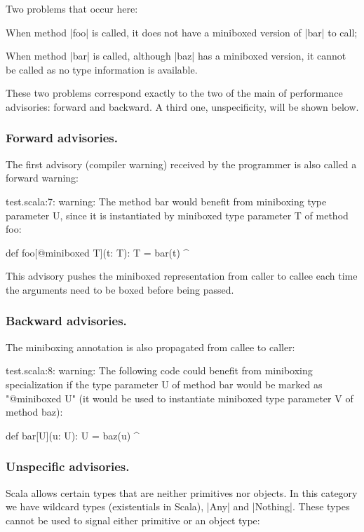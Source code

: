 Two problems that occur here:

\begin{compactitem}
 \item When method |foo| is called, it does not have a miniboxed version of |bar| to call;
 \item When method |bar| is called, although |baz| has a miniboxed version, it cannot be called as no type information is available.
\end{compactitem}

These two problems correspond exactly to the two of the main of performance advisories: forward and backward. A third one, unspecificity, will be shown below.

\subsubsection{Forward advisories.} The first advisory (compiler warning) received by the programmer is also called a forward warning:

\begin{lstlisting-nobreak-nolang}
test.scala:7: warning: The method bar would benefit from miniboxing type parameter U, since it is instantiated by miniboxed type parameter T of method foo:

       def foo[@miniboxed T](t: T): T = bar(t)
                                        ^
\end{lstlisting-nobreak-nolang}

This advisory pushes the miniboxed representation from caller to callee each time the arguments need to be boxed before being passed.

\subsubsection{Backward advisories.} The miniboxing annotation is also propagated from callee to caller:

\begin{lstlisting-nobreak-nolang}
test.scala:8: warning: The following code could benefit from miniboxing specialization if the type parameter U of method bar would be marked as "@miniboxed U" (it would be used to instantiate miniboxed type parameter V of method baz):

        def bar[U](u: U): U = baz(u)
                                     ^
\end{lstlisting-nobreak-nolang}

\subsubsection{Unspecific advisories.} Scala allows certain types that are neither primitives nor objects. In this category we have wildcard types (existentials in Scala), |Any| and |Nothing|. These types cannot be used to signal either primitive or an object type:

